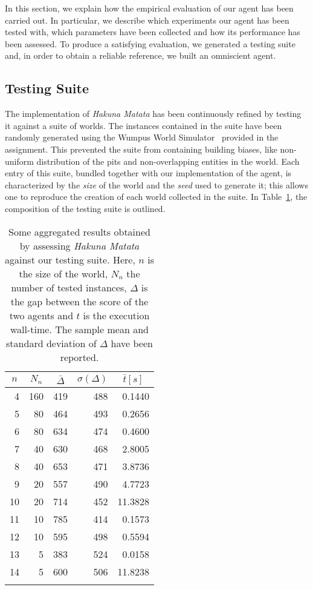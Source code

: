 \documentclass{llncs}
\newcommand{\hm}{\emph{Hakuna Matata}\xspace}
\begin{document}
In this section, we explain how the empirical evaluation of our agent has been carried out.
In particular, we describe which experiments our agent has been tested with, which parameters have been collected and how its performance has been assessed.
To produce a satisfying evaluation, we generated a testing suite and, in order to obtain a reliable reference, we built an omniscient agent.

\subsection{Testing Suite}

The implementation of \hm has been continuously refined by testing it against a suite of worlds.
The instances contained in the suite have been randomly generated using the Wumpus World Simulator~\cite{WWS} provided in the assignment.
This prevented the suite from containing building biases, like non-uniform distribution of the pits and non-overlapping entities in the world.
Each entry of this suite, bundled together with our implementation of the agent, is characterized by the \emph{size} of the world and the \emph{seed} used to generate it; this allows one to reproduce the creation of each world collected in the suite.
In Table~\ref{tbl:test}, the composition of the testing suite is outlined.

\begin{table}[t]
	\label{tbl:test}
	\centering
	\begin{tabular}{rrrrr}
	\toprule
	\multicolumn{1}{c}{$n$} & \multicolumn{1}{c}{$N_n$} & \multicolumn{1}{c}{$\bar{\Delta}$} & \multicolumn{1}{c}{$\sigma(\Delta)$} & \multicolumn{1}{c}{$\bar{t} [s]$}\\
	\midrule
	 4 & 160 & 419 & 488 &  0.1440 \\
	 5 &  80 & 464 & 493 &  0.2656 \\
	 6 &  80 & 634 & 474 &  0.4600 \\
	 7 &  40 & 630 & 468 &  2.8005 \\
	 8 &  40 & 653 & 471 &  3.8736 \\
	 9 &  20 & 557 & 490 &  4.7723 \\
	10 &  20 & 714 & 452 & 11.3828 \\
	11 &  10 & 785 & 414 &  0.1573 \\
	12 &  10 & 595 & 498 &  0.5594 \\
	13 &   5 & 383 & 524 &  0.0158 \\
	14 &   5 & 600 & 506 & 11.8238 \\
	\bottomrule\\
	\end{tabular}
	\caption{Some aggregated results obtained by assessing \hm against our testing suite. Here, $n$ is the size of the world, $N_n$ the number of tested instances, $\Delta$ is the gap between the score of the two agents and $t$ is the execution wall-time. The sample mean and standard deviation of $\Delta$ have been reported.}
\end{table}
\end{document}
